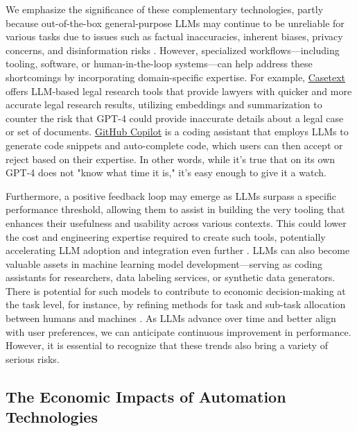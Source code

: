 \documentclass[11pt]{article}
\begin{document}
We emphasize the significance of these complementary technologies, partly because out-of-the-box general-purpose LLMs may continue to be unreliable for various tasks due to issues such as factual inaccuracies, inherent biases, privacy concerns, and disinformation risks \citep{abid_persistent_2021, schramowski_large_2022, goldstein_generative_2023, 4systemcard}. However, specialized workflows—including tooling, software, or human-in-the-loop systems—can help address these shortcomings by incorporating domain-specific expertise. For example, \href{https://casetext.com/}{Casetext} offers LLM-based legal research tools that provide lawyers with quicker and more accurate legal research results, utilizing embeddings and summarization to counter the risk that GPT-4 could provide inaccurate details about a legal case or set of documents. \href{https://github.com/features/copilot}{GitHub Copilot} is a coding assistant that employs LLMs to generate code snippets and auto-complete code, which users can then accept or reject based on their expertise. In other words, while it's true that on its own GPT-4 does not "know what time it is," it's easy enough to give it a watch.

Furthermore, a positive feedback loop may emerge as LLMs surpass a specific performance threshold, allowing them to assist in building the very tooling that enhances their usefulness and usability across various contexts. This could lower the cost and engineering expertise required to create such tools, potentially accelerating LLM adoption and integration even further \citep{chen2021evaluating, peng2023impact}. LLMs can also become valuable assets in machine learning model development—serving as coding assistants for researchers, data labeling services, or synthetic data generators. There is potential for such models to contribute to economic decision-making at the task level, for instance, by refining methods for task and sub-task allocation between humans and machines \citep{Singla2015LearningTH,Shahaf2010GeneralizedTM}. As LLMs advance over time and better align with user preferences, we can anticipate continuous improvement in performance. However, it is essential to recognize that these trends also bring a variety of serious risks. \citep{hazard_analysis, Weidinger2022, solaiman_release}


\subsection{The Economic Impacts of Automation Technologies}
\end{document}
